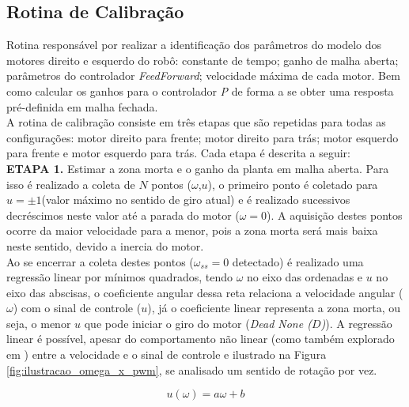 \subsection{Rotina de Calibração}
\label{subsec:rotina_calibracao}

Rotina responsável por realizar a identificação dos parâmetros do modelo dos motores direito e esquerdo do robô: constante de tempo; ganho de malha aberta; parâmetros do controlador \emph{FeedForward}; velocidade máxima de cada motor. Bem como calcular os ganhos para o controlador \emph{P} de forma a se obter uma resposta pré-definida em malha fechada.\\

A rotina de calibração consiste em três etapas que são repetidas para todas as configurações: motor direito para frente; motor direito para trás; motor esquerdo para frente e motor esquerdo para trás. Cada etapa é descrita a seguir: \\


\textbf{ETAPA 1.} Estimar a zona morta e o ganho da planta em malha aberta. Para isso é realizado a coleta de $N$ pontos ($\omega$,$u$), o primeiro ponto é coletado para $u = \pm1$(valor máximo no sentido de giro atual) e é realizado sucessivos decréscimos neste valor até a parada do motor ($\omega = 0$). A aquisição destes pontos ocorre da maior velocidade para a menor, pois a zona morta será mais baixa neste sentido, devido a inercia do motor.\\

Ao se encerrar a coleta destes pontos ($\omega_{ss} = 0$ detectado) é realizado uma regressão linear por mínimos quadrados, tendo $\omega$ no eixo das ordenadas e $u$ no eixo das abscisas, o coeficiente angular dessa reta relaciona a velocidade angular ($\omega$) com o sinal de controle ($u$), já o coeficiente linear representa a zona morta, ou seja, o menor $u$ que pode iniciar o giro do motor (\emph{Dead None ($D$)}). A regressão linear é possível, apesar do comportamento não linear (como também explorado em \cite{dead_zone}) entre a velocidade e o sinal de controle e ilustrado na Figura \ref{fig:ilustracao_omega_x_pwm}, se analisado um sentido de rotação por vez.

\begin{equation*}
    u(\omega) = a\omega + b
\end{equation*}

